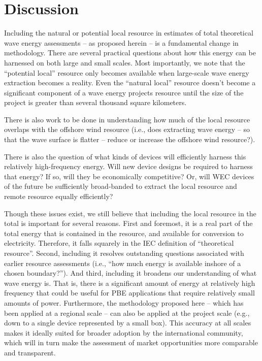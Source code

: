 \section{Discussion} \label{sec:discussion}

Including the natural or potential local resource in estimates of total theoretical wave energy assessments -- as proposed herein -- is a fundamental change in methodology. There are several practical questions about how this energy can be harnessed on both large and small scales. 
Most importantly, we note that the ``potential local'' resource only becomes available when large-scale wave energy extraction becomes a reality. Even the ``natural local'' resource doesn't become a significant component of a wave energy projects resource until the size of the project is greater than several thousand square kilometers. 

There is also work to be done in understanding how much of the local resource overlaps with the offshore wind resource (i.e., does extracting wave energy -- so that the wave surface is flatter -- reduce or increase the offshore wind resource?).

There is also the question of what kinds of devices will efficiently harness this relatively high-frequency energy. Will new device designs be required to harness that energy? If so, will they be economically competitive? Or, will WEC devices of the future be sufficiently broad-banded to extract the local resource and remote resource equally efficiently? 

Though these issues exist, we still believe that including the local resource in the total is important for several reasons. First and foremost, it is a real part of the total energy that is contained in the resource, and available for conversion to electricity. Therefore, it falls squarely in the IEC definition of ``theoretical resource''. Second, including it resolves outstanding questions associated with earlier resource assessments (i.e., ``how much energy is available inshore of a chosen boundary?''). And third, including it broadens our understanding of what wave energy is. That is, there is a significant amount of energy at relatively high frequency that could be useful for PBE applications that require relatively small amounts of power. Furthermore, the methodology proposed here -- which has been applied at a regional scale -- can also be applied at the project scale (e.g., down to a single device represented by a small box).
This accuracy at all scales makes it ideally suited for broader adoption by the international community, which will in turn make the assessment of market opportunities more comparable and transparent.

